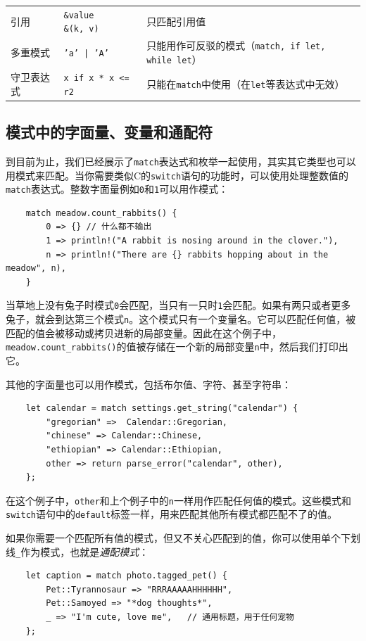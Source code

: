 \begin{table}[htbp]
\begin{tabular}{p{}p{}p{}}
        \rowcolor{tablecolor}
        引用    & \makecell[l]{\texttt{\&value} \\ \texttt{\&(k, v)}}   & 只匹配引用值 \\
        多重模式    & \texttt{'a' | 'A'}    & 只能用作可反驳的模式（\texttt{match, if let, while let}） \\
        \rowcolor{tablecolor}
        守卫表达式  & \texttt{x if x * x <= r2} & 只能在\texttt{match}中使用（在\texttt{let}等表达式中无效） \\
    \end{tabular}
\end{table}

\subsection{模式中的字面量、变量和通配符}
到目前为止，我们已经展示了\texttt{match}表达式和枚举一起使用，其实其它类型也可以用模式来匹配。当你需要类似C的\texttt{switch}语句的功能时，可以使用处理整数值的\texttt{match}表达式。整数字面量例如\texttt{0}和\texttt{1}可以用作模式：
\begin{verbatim}
    match meadow.count_rabbits() {
        0 => {} // 什么都不输出
        1 => println!("A rabbit is nosing around in the clover."),
        n => println!("There are {} rabbits hopping about in the meadow", n),
    }
\end{verbatim}

当草地上没有兔子时模式\texttt{0}会匹配，当只有一只时\texttt{1}会匹配。如果有两只或者更多兔子，就会到达第三个模式\texttt{n}。这个模式只有一个变量名。它可以匹配任何值，被匹配的值会被移动或拷贝进新的局部变量。因此在这个例子中，\texttt{meadow.count\_rabbits()}的值被存储在一个新的局部变量\texttt{n}中，然后我们打印出它。

其他的字面量也可以用作模式，包括布尔值、字符、甚至字符串：
\begin{verbatim}
    let calendar = match settings.get_string("calendar") {
        "gregorian" =>  Calendar::Gregorian,
        "chinese" => Calendar::Chinese,
        "ethiopian" => Calendar::Ethiopian,
        other => return parse_error("calendar", other),
    };
\end{verbatim}

在这个例子中，\texttt{other}和上个例子中的\texttt{n}一样用作匹配任何值的模式。这些模式和\texttt{switch}语句中的\texttt{default}标签一样，用来匹配其他所有模式都匹配不了的值。

如果你需要一个匹配所有值的模式，但又不关心匹配到的值，你可以使用单个下划线\texttt{\_}作为模式，也就是\emph{通配模式}：
\begin{verbatim}
    let caption = match photo.tagged_pet() {
        Pet::Tyrannosaur => "RRRAAAAAHHHHHH",
        Pet::Samoyed => "*dog thoughts*",
        _ => "I'm cute, love me",   // 通用标题，用于任何宠物
    };
\end{verbatim}

